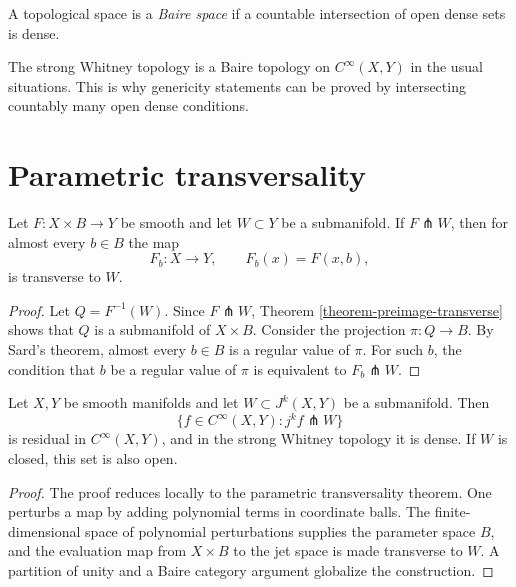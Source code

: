 \begin{definition}
\label{definition-baire-space}
A topological space is a {\it Baire space} if
a countable intersection of open dense sets
is dense.
\end{definition}

\noindent
The strong Whitney topology is a Baire
topology on $C^\infty(X,Y)$ in the usual
situations.  This is why genericity
statements can be proved by intersecting
countably many open dense conditions.

\section{Parametric transversality}
\label{section-parametric-transversality}

\begin{theorem}
\label{theorem-parametric-transversality}
Let $F:X\times B\to Y$ be smooth and let
$W\subset Y$ be a submanifold.  If
$F\pitchfork W$, then for almost every
$b\in B$ the map
$$
F_b:X\to Y,
\qquad
F_b(x)=F(x,b),
$$
is transverse to $W$.
\end{theorem}

\begin{proof}
Let $Q=F^{-1}(W)$.  Since $F\pitchfork W$,
Theorem \ref{theorem-preimage-transverse}
shows that $Q$ is a submanifold of
$X\times B$.  Consider the projection
$\pi:Q\to B$.  By Sard's theorem, almost
every $b\in B$ is a regular value of $\pi$.
For such $b$, the condition that $b$ be a
regular value of $\pi$ is equivalent to
$F_b\pitchfork W$.
\end{proof}

\begin{theorem}
\label{theorem-thom-transversality}
Let $X,Y$ be smooth manifolds and let
$W\subset J^k(X,Y)$ be a submanifold.  Then
$$
\{f\in C^\infty(X,Y):j^kf\pitchfork W\}
$$
is residual in $C^\infty(X,Y)$, and in the
strong Whitney topology it is dense.  If
$W$ is closed, this set is also open.
\end{theorem}

\begin{proof}
The proof reduces locally to the parametric
transversality theorem.  One perturbs a map
by adding polynomial terms in coordinate
balls.  The finite-dimensional space of
polynomial perturbations supplies the
parameter space $B$, and the evaluation map
from $X\times B$ to the jet space is made
transverse to $W$.  A partition of unity and
a Baire category argument globalize the
construction.
\end{proof}

